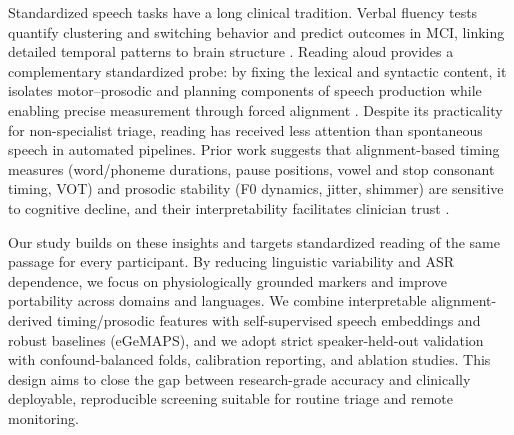 \documentclass{article}
\begin{document}
Standardized speech tasks have a long clinical tradition. Verbal fluency tests quantify clustering and switching behavior and predict outcomes in MCI, linking detailed temporal patterns to brain structure \citep{fluency2016}. Reading aloud provides a complementary standardized probe: by fixing the lexical and syntactic content, it isolates motor–prosodic and planning components of speech production while enabling precise measurement through forced alignment \citep{mfa}. Despite its practicality for non-specialist triage, reading has received less attention than spontaneous speech in automated pipelines. Prior work suggests that alignment-based timing measures (word/phoneme durations, pause positions, vowel and stop consonant timing, VOT) and prosodic stability (F0 dynamics, jitter, shimmer) are sensitive to cognitive decline, and their interpretability facilitates clinician trust \citep{review2020,longitudinal2017}.

Our study builds on these insights and targets standardized reading of the same passage for every participant. By reducing linguistic variability and ASR dependence, we focus on physiologically grounded markers and improve portability across domains and languages. We combine interpretable alignment-derived timing/prosodic features with self-supervised speech embeddings and robust baselines (eGeMAPS), and we adopt strict speaker-held-out validation with confound-balanced folds, calibration reporting, and ablation studies. This design aims to close the gap between research-grade accuracy and clinically deployable, reproducible screening suitable for routine triage and remote monitoring.
\end{document}
